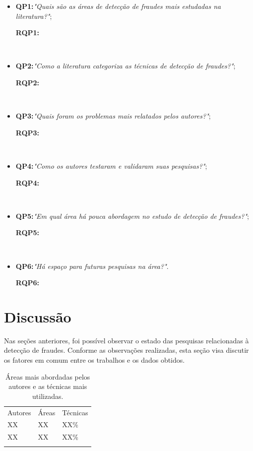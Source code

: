 \documentclass[smallextended]{svjour3}
\begin{document}
\begin{itemize}
	\item \textbf{QP1:}\textit{"Quais são as áreas de detecção de fraudes mais estudadas na literatura?"};
	
	\textbf{RQP1:}
	
	\
	\item \textbf{QP2:}\textit{"Como a literatura categoriza as técnicas de detecção de fraudes?"};
	
	\textbf{RQP2:}
	
	\
	\item \textbf{QP3:}\textit{"Quais foram os problemas mais relatados pelos autores?"};
	
	\textbf{RQP3:}
	
	\
	\item \textbf{QP4:}\textit{"Como os autores testaram e validaram suas pesquisas?"};
	
	\textbf{RQP4:}
	
	\
	\item \textbf{QP5:}\textit{"Em qual área há pouca abordagem no estudo de detecção de fraudes?"};
	
	\textbf{RQP5:}
	
	\
	\item \textbf{QP6:}\textit{"Há espaço para futuras pesquisas na área?"}.
	
	\textbf{RQP6:}
	
\end{itemize}

\section{Discussão}
\label{sec:5}

Nas seções anteriores, foi possível observar o estado das pesquisas relacionadas à detecção de fraudes. Conforme as observações realizadas, esta seção visa discutir os fatores em comum entre os trabalhos e os dados obtidos.

\begin{table}
	\caption{Áreas mais abordadas pelos autores e as técnicas mais utilizadas.}
	\label{tab:XX}       %
	\begin{tabular}[!Ht]{lll}
		\hline\noalign{\smallskip}
		Autores & Áreas & Técnicas  \\
		\noalign{\smallskip}\hline\noalign{\smallskip}
		XX & XX & XX\% \\
		XX & XX & XX\% \\
		\noalign{\smallskip}\hline
	\end{tabular}
\end{table}
\end{document}
